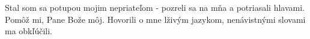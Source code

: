 Stal som sa potupou mojim nepriateľom - pozreli sa na mňa a potriasali hlavami.
\versseparator 
Pomôž mi, Pane Bože môj.
\versseparator 
Hovorili o mne lživým jazykom, nenávistnými slovami ma obkľúčili.

